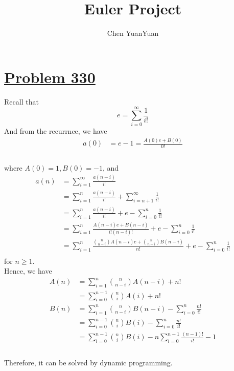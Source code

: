 \documentclass{article}
\title{Euler Project}
\author{Chen YuanYuan}
\newcommand{\problemsection}[1]{\section{\href{https://projecteuler.net/problem=#1}{Problem #1}}}
\begin{document}
\maketitle
\problemsection{330}
Recall that  \\
\[
  e=\sum_{i=0}^{\infty}\frac{1}{i!}
\]
And from the recurrnce, we have \\
\begin{align*}
  a(0) & =e-1=\frac{A(0)e+B(0)}{0!} \\
\end{align*} \\
where $A(0)=1,B(0)=-1$, and \\
\begin{align*}
  a(n) & =\sum_{i=1}^{\infty}\frac{a(n-i)}{i!}                                                             \\
       & =\sum_{i=1}^{n}\frac{a(n-i)}{i!}+\sum_{i=n+1}^{\infty}\frac{1}{i!}                                \\
       & =\sum_{i=1}^{n}\frac{a(n-i)}{i!}+e-\sum_{i=0}^{n}\frac{1}{i!}                                     \\
       & =\sum_{i=1}^{n}\frac{A(n-i)e+B(n-i)}{i!(n-i)!}+e-\sum_{i=0}^{n}\frac{1}{i!}                       \\
       & =\sum_{i=1}^{n}\frac{\binom{n}{n-i}A(n-i)e+\binom{n}{n-i}B(n-i)}{n!}+e-\sum_{i=0}^{n}\frac{1}{i!} \\
\end{align*}
for $n\geq 1$.\\
Hence, we have
\begin{align*}
  A(n) & =\sum_{i=1}^{n}\binom{n}{n-i}A(n-i)+n!                                 \\
       & =\sum_{i=0}^{n-1}\binom{n}{i}A(i)+n!                                   \\
  B(n) & =\sum_{i=1}^{n}\binom{n}{n-i}B(n-i)-\sum_{i=0}^{n}\frac{n!}{i!}        \\
       & =\sum_{i=0}^{n-1}\binom{n}{i}B(i)-\sum_{i=0}^{n}\frac{n!}{i!}          \\
       & =\sum_{i=0}^{n-1}\binom{n}{i}B(i)-n\sum_{i=0}^{n-1}\frac{(n-1)!}{i!}-1 \\
\end{align*} \\
Therefore, it can be solved by dynamic programming.
\end{document}
